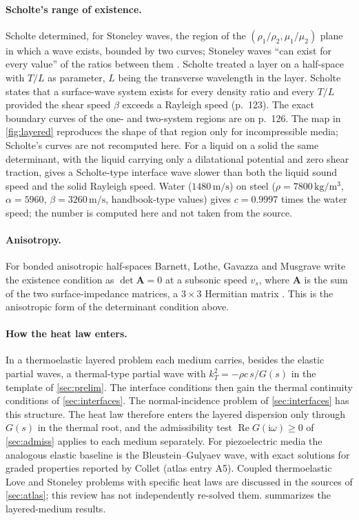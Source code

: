 \paragraph{Scholte's range of existence.} Scholte determined, for Stoneley waves, the region of the $(\rho_1/\rho_2,\mu_1/\mu_2)$ plane in which a wave exists, bounded by two curves; Stoneley waves ``can exist for every value'' of the ratios between them \citep[p.~120]{Scholte1947}. Scholte treated a layer on a half-space with $T/L$ as parameter, $L$ being the transverse wavelength in the layer. Scholte states that a surface-wave system exists for every density ratio and every $T/L$ provided the shear speed $\beta$ exceeds a Rayleigh speed (p.~123). The exact boundary curves of the one- and two-system regions are on p.~126. The map in \cref{fig:layered} reproduces the shape of that region only for incompressible media; Scholte's curves are not recomputed here. For a liquid on a solid the same determinant, with the liquid carrying only a dilatational potential and zero shear traction, gives a Scholte-type interface wave slower than both the liquid sound speed and the solid Rayleigh speed. Water ($1480\,\mathrm{m/s}$) on steel ($\rho=7800\,\mathrm{kg/m^3}$, $\alpha=5960$, $\beta=3260\,\mathrm{m/s}$, handbook-type values) gives $c=0.9997$ times the water speed; the number is computed here and not taken from the source.

\paragraph{Anisotropy.} For bonded anisotropic half-spaces Barnett, Lothe, Gavazza and Musgrave write the existence condition as $\det\mathbf A=0$ at a subsonic speed $v_s$, where $\mathbf A$ is the sum of the two surface-impedance matrices, a $3\times3$ Hermitian matrix \citep[eq.~(2.11), p.~156]{Barnett1985}. This is the anisotropic form of the determinant condition above.

\paragraph{How the heat law enters.} In a thermoelastic layered problem each medium carries, besides the elastic partial waves, a thermal-type partial wave with $k_T^2=-\rho c\,s/G(s)$ in the template of \cref{sec:prelim}. The interface conditions then gain the thermal continuity conditions of \cref{sec:interfaces}. The normal-incidence problem of \cref{sec:interfaces} has this structure. The heat law therefore enters the layered dispersion only through $G(s)$ in the thermal root, and the admissibility test $\operatorname{Re}G(\mathrm i\omega)\ge0$ of \cref{sec:admiss} applies to each medium separately. For piezoelectric media the analogous elastic baseline is the Bleustein--Gulyaev wave, with exact solutions for graded properties reported by Collet \citep{Collet2006} (atlas entry A5). Coupled thermoelastic Love and Stoneley problems with specific heat laws are discussed in the sources of \cref{sec:atlas}; this review has not independently re-solved them.  summarizes the layered-medium results.

